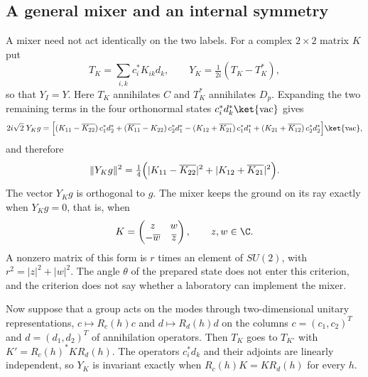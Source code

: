 \subsection{A general mixer and an internal symmetry}
\label{subsec:pair-currents-mixers}

A mixer need not act identically on the two labels. For a complex $2\times2$ matrix $K$ put
\begin{equation}
 T_K=\sum_{i,k}c_i^*K_{ik}d_k,\qquad Y_K=\tfrac1{2i}(T_K-T_K^*),
 \label{eq:pair-currents-mixer}
\end{equation}
so that $Y_I=Y$. Here $T_K$ annihilates $C$ and $T_K^*$ annihilates $D_p$. Expanding the two remaining terms in the four orthonormal states $c_i^*d_k^*\ket{\mathrm{vac}}$ gives
\begin{equation}
 2i\sqrt2\;Y_Kg=\Bigl[(K_{11}-\overline{K_{22}})\,c_1^*d_2^*+(\overline{K_{11}}-K_{22})\,c_2^*d_1^*
 -(K_{12}+\overline{K_{21}})\,c_1^*d_1^*+(K_{21}+\overline{K_{12}})\,c_2^*d_2^*\Bigr]\ket{\mathrm{vac}},
 \label{eq:pair-currents-mixer-image}
\end{equation}
and therefore
\begin{equation}
 \|Y_Kg\|^2=\tfrac14\Bigl(|K_{11}-\overline{K_{22}}|^2+|K_{12}+\overline{K_{21}}|^2\Bigr).
 \label{eq:pair-currents-leakage}
\end{equation}
The vector $Y_Kg$ is orthogonal to $g$. The mixer keeps the ground on its ray exactly when $Y_Kg=0$, that is, when
\begin{equation}
 K=\begin{pmatrix}z&w\\-\overline w&\overline z\end{pmatrix},\qquad z,w\in\C .
 \label{eq:pair-currents-quaternion}
\end{equation}
A nonzero matrix of this form is $r$ times an element of $SU(2)$, with $r^2=|z|^2+|w|^2$. The angle $\theta$ of the prepared state does not enter this criterion, and the criterion does not say whether a laboratory can implement the mixer.

Now suppose that a group acts on the modes through two-dimensional unitary representations, $c\mapsto R_c(h)c$ and $d\mapsto R_d(h)d$ on the columns $c=(c_1,c_2)^T$ and $d=(d_1,d_2)^T$ of annihilation operators. Then $T_K$ goes to $T_{K'}$ with $K'=R_c(h)^*KR_d(h)$. The operators $c_i^*d_k$ and their adjoints are linearly independent, so $Y_K$ is invariant exactly when $R_c(h)K=KR_d(h)$ for every $h$.

